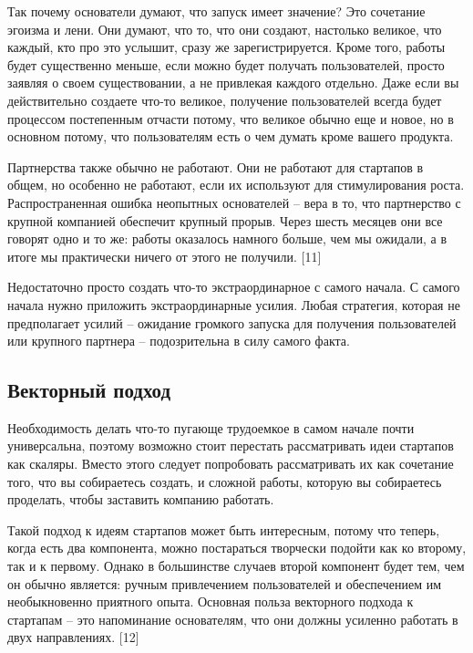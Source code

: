 \documentclass[ebook,12pt,oneside,openany]{memoir}
\begin{document}
Так почему основатели думают, что запуск имеет значение? Это сочетание
эгоизма и лени. Они думают, что то, что они создают, настолько
великое, что каждый, кто про это услышит, сразу же зарегистрируется.
Кроме того, работы будет существенно меньше, если можно будет получать
пользователей, просто заявляя о своем существовании, а не привлекая
каждого отдельно. Даже если вы действительно создаете что-то великое,
получение пользователей всегда будет процессом постепенным отчасти
потому, что великое обычно еще и новое, но в основном потому, что
пользователям есть о чем думать кроме вашего продукта. \newline

Партнерства также обычно не работают. Они не работают для стартапов в
общем, но особенно не работают, если их используют для стимулирования
роста. Распространенная ошибка неопытных основателей – вера в то, что
партнерство с крупной компанией обеспечит крупный прорыв. Через шесть
месяцев они все говорят одно и то же: работы оказалось намного больше,
чем мы ожидали, а в итоге мы практически ничего от этого не получили.
[11] \newline

Недостаточно просто создать что-то экстраординарное с самого начала. С
самого начала нужно приложить экстраординарные усилия. Любая
стратегия, которая не предполагает усилий – ожидание громкого запуска
для получения пользователей или крупного партнера – подозрительна в
силу самого факта. \newline

\subsection{Векторный подход}

Необходимость делать что-то пугающе трудоемкое в самом начале почти
универсальна, поэтому возможно стоит перестать рассматривать идеи
стартапов как скаляры. Вместо этого следует попробовать рассматривать
их как сочетание того, что вы собираетесь создать, и сложной работы,
которую вы собираетесь проделать, чтобы заставить компанию работать. \newline

Такой подход к идеям стартапов может быть интересным, потому что
теперь, когда есть два компонента, можно постараться творчески подойти
как ко второму, так и к первому. Однако в большинстве случаев второй
компонент будет тем, чем он обычно является: ручным привлечением
пользователей и обеспечением им необыкновенно приятного опыта.
Основная польза векторного подхода к стартапам – это напоминание
основателям, что они должны усиленно работать в двух направлениях.
[12] \newline
\end{document}
